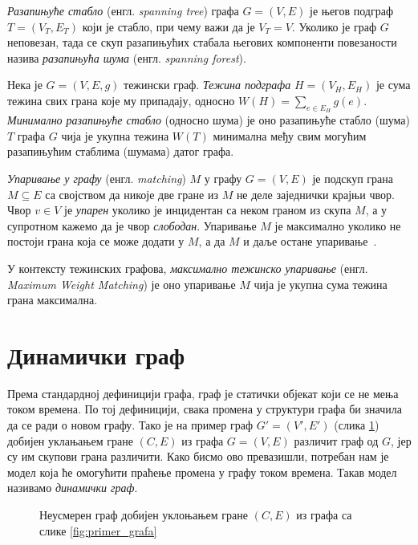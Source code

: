 \textit{Разапињуће стабло} (енгл. \textit{spanning tree}) графа $G=(V,E)$ је његов подграф $T=(V_T, E_T)$ који је стабло, при чему важи да је $V_T = V$. Уколико је граф $G$ неповезан, тада се скуп разапињућих стабала његових компоненти повезаности назива \textit{разапињућа шума} (енгл. \textit{spanning forest}).

Нека је $G=(V,E,g)$ тежински граф. \textit{Тежина подграфа} $H=(V_H, E_H)$ је сума тежина свих грана које му припадају, односно $W(H) = \sum_{e \in E_H} g(e)$. \textit{Минимално разапињуће стабло} (односно шума) је оно разапињуће стабло (шума) $T$ графа $G$ чија је укупна тежина $W(T)$ минимална међу свим могућим разапињућим стаблима (шумама) датог графа.

\textit{Упаривање у графу} (енгл. \textit{matching}) $M$ у графу $G=(V,E)$ је подскуп грана $M \subseteq E$ са својством да никоје две гране из $M$ не деле заједнички крајњи чвор. Чвор $v \in V$ је \textit{упарен} уколико је инцидентан са неком граном из скупа $M$, а у супротном кажемо да је чвор \textit{слободан}. Упаривање $M$ је максимално уколико не постоји грана која се може додати у $M$, а да $M$ и даље остане упаривање~\cite{angrimanBatchdynamicSuitorAlgorithm2022}. 

У контексту тежинских графова, \textit{максимално тежинско упаривање} (енгл. \textit{Maximum Weight Matching}) је оно упаривање $M$ чија је укупна сума тежина грана максимална.

\section{Динамички граф}

Према стандардној дефиницији графа, граф је статички објекат који се не мења током времена. По тој дефиницији, свака промена у структури графа би значила да се ради о новом графу. Тако је на пример граф $G'=(V',E')$ (слика \ref{fig:primer_grafa2}) добијен уклањањем гране $(C,E)$ из графа $G=(V,E)$ различит граф од $G$, јер су им скупови грана различити. Како бисмо ово превазишли, потребан нам је модел која ће омогућити праћење промена у графу током времена. Такав модел називамо \textit{динамички граф}.

\begin{figure}[ht]
\centering
\begingroup
{}
\endgroup
\caption{Неусмерен граф добијен уклоњањем гране $(C,E)$ из графа са слике \ref{fig:primer_grafa}}
\label{fig:primer_grafa2}
\end{figure}


